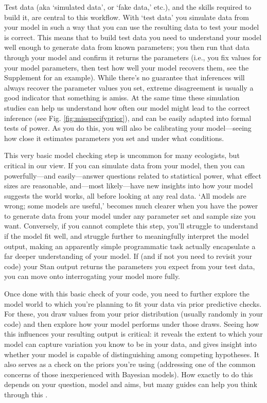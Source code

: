 \documentclass[11pt]{article}
\begin{document}
Test data (aka `simulated data', or  `fake data,' etc.), and the skills required to build it, are central to this workflow. With `test data' you simulate data from your model in such a way that you can use the resulting data to test your model is correct. This means that to build test data you need to understand your model well enough to generate data from known parameters; you then run that data through your model and confirm it returns the parameters (i.e., you fix values for your model parameters, then test how well your model recovers them, see the Supplement for an example). While there's no guarantee that inferences will always recover the parameter values you set, extreme disagreement is usually a good indicator that something is amiss. At the same time these simulation studies can help us understand how often our model might lead to the correct inference (see Fig. \ref{fig:misspecifyprior}), and can be easily adapted into formal tests of power. As you do this, you will also be calibrating your model---seeing how close it estimates parameters you set and under what conditions. %

This very basic model checking step is uncommon for many ecologists, but critical in our view. If you can simulate data from your model, then you can powerfully---and easily---answer questions related to statistical power, what effect sizes are reasonable, and---most likely---have new insights into how your model suggests the world works, all before looking at any real data. `All models are wrong; some models are useful,' becomes much clearer when you have the power to generate data from your model under any parameter set and sample size you want. Conversely, if you cannot complete this step, you'll struggle to understand if the model fit well, and struggle further to meaningfully interpret the model output, making an apparently simple programmatic task actually encapsulate a far deeper understanding of your model. If (and if not you need to revisit your code) your \textsf{Stan} output returns the parameters you expect from your test data, you can move onto interrogating your model more fully. 

Once done with this basic check of your code, you need to further explore the model world to which you're planning to fit your data via prior predictive checks. For these, you draw values from your prior distribution (usually randomly in your code) and then explore how your model performs under those draws. Seeing how this influences your resulting output is critical: it reveals the extent to which your model can capture variation you know to be in your data, and gives insight into whether your model is capable of distinguishing among competing hypotheses. It also serves as a check on the priors you're using (addressing one of the common concerns of those inexperienced with Bayesian models). How exactly to do this depends on your question, model and aims, but many guides can help you think through this \citep{betanprior,wesner2021,winter2023}. 
\end{document}
